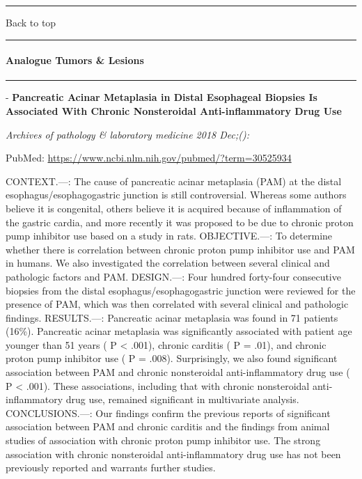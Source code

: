 \documentclass[]{article}
\let\oldparagraph\paragraph
\renewcommand{\paragraph}[1]{\oldparagraph{#1}\mbox{}}
\begin{document}
{}

{}

\begin{center}\rule{0.5\linewidth}{\linethickness}\end{center}

Back to top

\begin{center}\rule{0.5\linewidth}{\linethickness}\end{center}

\pagebreak

\hypertarget{analogue-tumors-lesions}{%
\paragraph{Analogue Tumors \& Lesions}\label{analogue-tumors-lesions}}

\begin{center}\rule{0.5\linewidth}{\linethickness}\end{center}

 - \textbf{Pancreatic Acinar Metaplasia in Distal Esophageal Biopsies Is
Associated With Chronic Nonsteroidal Anti-inflammatory Drug Use}

\emph{Archives of pathology \& laboratory medicine 2018 Dec;():}

PubMed: \url{https://www.ncbi.nlm.nih.gov/pubmed/?term=30525934}

CONTEXT.---: The cause of pancreatic acinar metaplasia (PAM) at the
distal esophagus/esophagogastric junction is still controversial.
Whereas some authors believe it is congenital, others believe it is
acquired because of inflammation of the gastric cardia, and more
recently it was proposed to be due to chronic proton pump inhibitor use
based on a study in rats. OBJECTIVE.---: To determine whether there is
correlation between chronic proton pump inhibitor use and PAM in humans.
We also investigated the correlation between several clinical and
pathologic factors and PAM. DESIGN.---: Four hundred forty-four
consecutive biopsies from the distal esophagus/esophagogastric junction
were reviewed for the presence of PAM, which was then correlated with
several clinical and pathologic findings. RESULTS.---: Pancreatic acinar
metaplasia was found in 71 patients (16\%). Pancreatic acinar metaplasia
was significantly associated with patient age younger than 51 years ( P
\textless{} .001), chronic carditis ( P = .01), and chronic proton pump
inhibitor use ( P = .008). Surprisingly, we also found significant
association between PAM and chronic nonsteroidal anti-inflammatory drug
use ( P \textless{} .001). These associations, including that with
chronic nonsteroidal anti-inflammatory drug use, remained significant in
multivariate analysis. CONCLUSIONS.---: Our findings confirm the
previous reports of significant association between PAM and chronic
carditis and the findings from animal studies of association with
chronic proton pump inhibitor use. The strong association with chronic
nonsteroidal anti-inflammatory drug use has not been previously reported
and warrants further studies.
\end{document}
